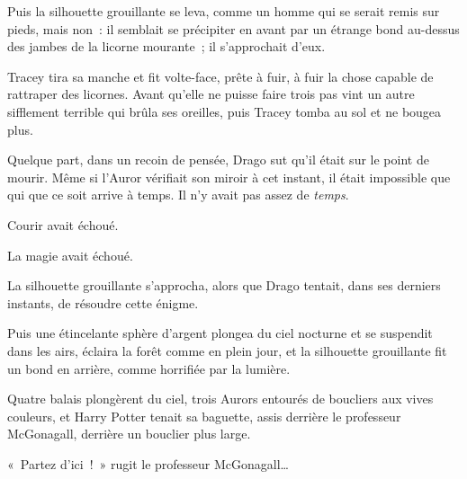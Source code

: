 Puis la silhouette grouillante se leva, comme un homme qui se serait remis sur pieds, mais non~: il semblait se précipiter en avant par un étrange bond au-dessus des jambes de la licorne mourante~; il s'approchait d'eux.

Tracey tira sa manche et fit volte-face, prête à fuir, à fuir la chose capable de rattraper des licornes.
Avant qu'elle ne puisse faire trois pas vint un autre sifflement terrible qui brûla ses oreilles, puis Tracey tomba au sol et ne bougea plus.

Quelque part, dans un recoin de pensée, Drago sut qu'il était sur le point de mourir.
Même si l'Auror vérifiait son miroir à cet instant, il était impossible que qui que ce soit arrive à temps.
Il n'y avait pas assez de \emph{temps}.

Courir avait échoué.

La magie avait échoué.

La silhouette grouillante s'approcha, alors que Drago tentait, dans ses derniers instants, de résoudre cette énigme.

Puis une étincelante sphère d'argent plongea du ciel nocturne et se suspendit dans les airs, éclaira la forêt comme en plein jour, et la silhouette grouillante fit un bond en arrière, comme horrifiée par la lumière.

Quatre balais plongèrent du ciel, trois Aurors entourés de boucliers aux vives couleurs, et Harry Potter tenait sa baguette, assis derrière le professeur McGonagall, derrière un bouclier plus large.

«~Partez d'ici~!~»
rugit le professeur McGonagall…

